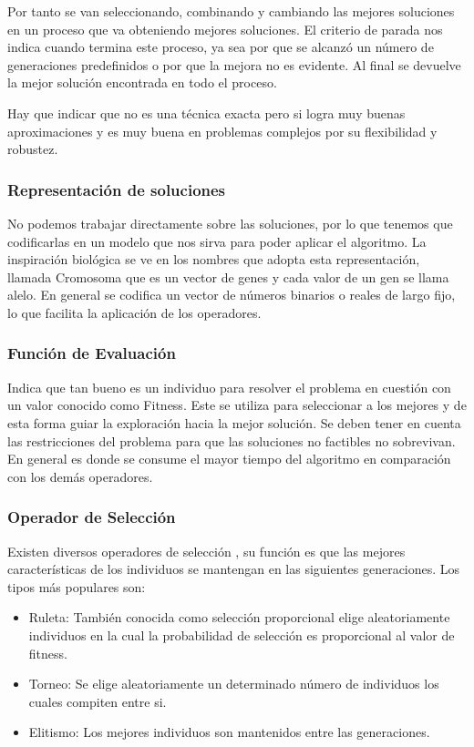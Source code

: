 Por tanto se van seleccionando, combinando y cambiando las mejores soluciones en un proceso que va obteniendo mejores soluciones.
El criterio de parada nos indica cuando termina este proceso, ya sea por que se alcanzó un número de generaciones predefinidos o por que la mejora no es evidente. Al final se devuelve la mejor solución encontrada en todo el proceso.

Hay que indicar que no es una técnica exacta pero si logra muy buenas aproximaciones y es muy buena en problemas complejos por su flexibilidad y robustez. 


\subsubsection{Representación de soluciones}
No podemos trabajar directamente sobre las soluciones, por lo que tenemos que codificarlas en un modelo que nos sirva para poder aplicar el algoritmo.
La inspiración biológica se ve en los nombres que adopta esta representación, llamada Cromosoma que es un vector de genes y cada valor de un gen se llama alelo.
En general se codifica un vector de números binarios o reales de largo fijo, lo que facilita la aplicación de los operadores.

\subsubsection{Función de Evaluación} 
Indica que tan bueno es un individuo para resolver el problema en cuestión con un valor conocido como Fitness. Este se utiliza para seleccionar a los mejores y de esta forma guiar la exploración hacia la mejor solución.
Se deben tener en cuenta las restricciones del problema para que las soluciones no factibles no sobrevivan.
En general es donde se consume el mayor tiempo del algoritmo en comparación con los demás operadores.

\subsubsection{Operador de Selección}
Existen diversos operadores de selección , su función es que las mejores características de los individuos se mantengan en las siguientes generaciones.
Los tipos más populares son:

\begin{itemize}
	\item Ruleta: También conocida como selección proporcional elige aleatoriamente individuos en la cual la probabilidad de selección es proporcional al valor de fitness.
	\item Torneo: Se elige aleatoriamente un determinado número de individuos los cuales compiten entre si.
	\item Elitismo: Los mejores individuos son mantenidos entre las generaciones.
\end{itemize}

